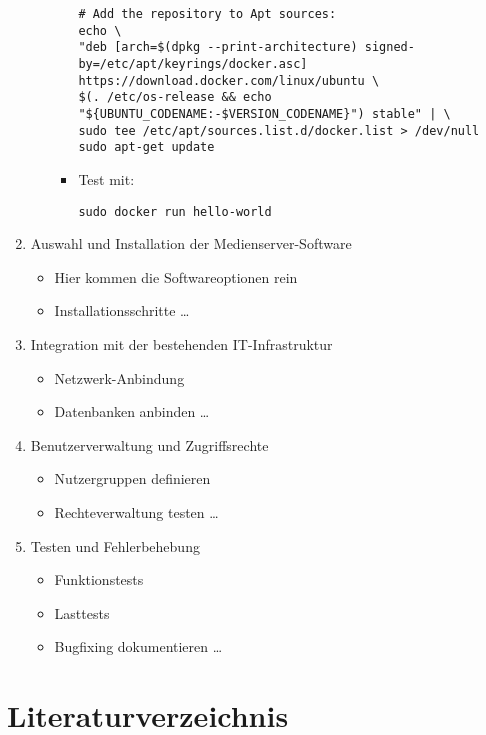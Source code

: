 \documentclass[12pt,a4paper]{report}
\begin{document}
\begin{enumerate}
\begin{itemize}
\begin{itemize}
\begin{verbatim}
# Add the repository to Apt sources:
echo \
"deb [arch=$(dpkg --print-architecture) signed-by=/etc/apt/keyrings/docker.asc] https://download.docker.com/linux/ubuntu \
$(. /etc/os-release && echo "${UBUNTU_CODENAME:-$VERSION_CODENAME}") stable" | \
sudo tee /etc/apt/sources.list.d/docker.list > /dev/null
sudo apt-get update
          \end{verbatim}

          \item Test mit:
          \begin{verbatim}
sudo docker run hello-world
          \end{verbatim}
        \end{itemize}
    \end{itemize}

  \item Auswahl und Installation der Medienserver-Software
    \begin{itemize}
      \item Hier kommen die Softwareoptionen rein
      \item Installationsschritte …
    \end{itemize}

  \item Integration mit der bestehenden IT-Infrastruktur
    \begin{itemize}
      \item Netzwerk-Anbindung
      \item Datenbanken anbinden …
    \end{itemize}

  \item Benutzerverwaltung und Zugriffsrechte
    \begin{itemize}
      \item Nutzergruppen definieren
      \item Rechteverwaltung testen …
    \end{itemize}

  \item Testen und Fehlerbehebung
    \begin{itemize}
      \item Funktionstests
      \item Lasttests
      \item Bugfixing dokumentieren …
    \end{itemize}
\end{enumerate}
\newpage

\chapter*{Literaturverzeichnis}
\printbibliography[heading=none]
\end{document}
